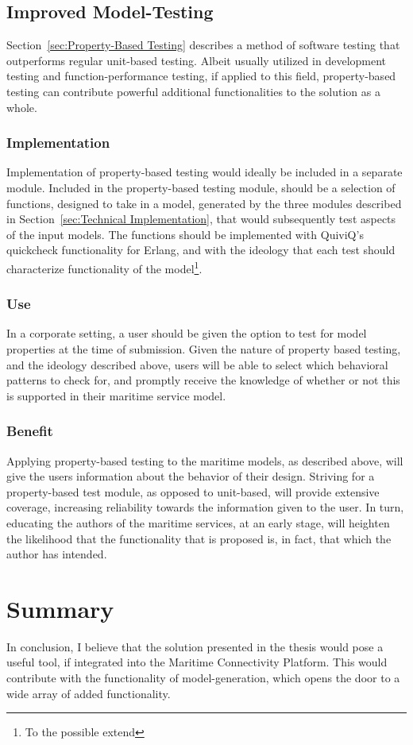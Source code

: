 \subsection{Improved Model-Testing}
Section~\ref{sec:Property-Based Testing} describes a method of software testing that outperforms regular unit-based testing. Albeit usually utilized in development testing and function-performance testing, if applied to this field, property-based testing can contribute powerful additional functionalities to the solution as a whole. 
\subsubsection{Implementation}
Implementation of property-based testing would ideally be included in a separate module. Included in the property-based testing module, should be a selection of functions, designed to take in a model, generated by the three modules described in Section~\ref{sec:Technical Implementation}, that would subsequently test aspects of the input models. The functions should be implemented with QuiviQ's quickcheck functionality for Erlang, and with the ideology that each test should characterize  functionality of the model\footnote{To the possible extend}.
\subsubsection{Use}
In a corporate setting, a user should be given the option to test for model properties at the time of submission. Given the nature of property based testing, and the ideology described above, users will be able to select which behavioral patterns to check for, and promptly receive the knowledge of whether or not this is supported in their maritime service model.
\subsubsection{Benefit}
Applying property-based testing to the maritime models, as described above, will give the users information about the behavior of their design. Striving for a property-based test module, as opposed to unit-based, will provide extensive coverage, increasing reliability towards the information given to the user. In turn, educating the authors of the maritime services, at an early stage, will heighten the likelihood that the functionality that is proposed is, in fact, that which the author has intended.
\section{Summary}
In conclusion, I believe that the solution presented in the thesis would pose a useful tool, if integrated into the Maritime Connectivity Platform. This would contribute with the functionality of model-generation, which opens the door to a wide array of added functionality. 

